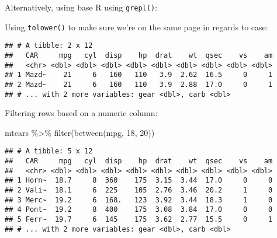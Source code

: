 \documentclass[
]{book}
\newenvironment{Shaded}{\begin{snugshade}}{\end{snugshade}}
\newcommand{\CommentTok}[1]{\textcolor[rgb]{0.56,0.35,0.01}{\textit{#1}}}
\newcommand{\DecValTok}[1]{\textcolor[rgb]{0.00,0.00,0.81}{#1}}
\newcommand{\FunctionTok}[1]{\textcolor[rgb]{0.00,0.00,0.00}{#1}}
\newcommand{\NormalTok}[1]{#1}
\newcommand{\SpecialCharTok}[1]{\textcolor[rgb]{0.00,0.00,0.00}{#1}}
\newcommand{\StringTok}[1]{\textcolor[rgb]{0.31,0.60,0.02}{#1}}
\begin{document}
Alternatively, using base R using \texttt{grepl()}:

\begin{Shaded}
\end{Shaded}

Using \texttt{tolower()} to make sure we're on the same page in regards to case:

\begin{Shaded}
\end{Shaded}

\begin{verbatim}
## # A tibble: 2 x 12
##   CAR     mpg   cyl  disp    hp  drat    wt  qsec    vs    am
##   <chr> <dbl> <dbl> <dbl> <dbl> <dbl> <dbl> <dbl> <dbl> <dbl>
## 1 Mazd~    21     6   160   110   3.9  2.62  16.5     0     1
## 2 Mazd~    21     6   160   110   3.9  2.88  17.0     0     1
## # ... with 2 more variables: gear <dbl>, carb <dbl>
\end{verbatim}

Filtering rows based on a numeric column:

\begin{Shaded}
\begin{Highlighting}[]
\NormalTok{mtcars }\SpecialCharTok{\%\textgreater{}\%} \FunctionTok{filter}\NormalTok{(}\FunctionTok{between}\NormalTok{(mpg, }\DecValTok{18}\NormalTok{, }\DecValTok{20}\NormalTok{))}
\end{Highlighting}
\end{Shaded}

\begin{verbatim}
## # A tibble: 5 x 12
##   CAR     mpg   cyl  disp    hp  drat    wt  qsec    vs    am
##   <chr> <dbl> <dbl> <dbl> <dbl> <dbl> <dbl> <dbl> <dbl> <dbl>
## 1 Horn~  18.7     8  360    175  3.15  3.44  17.0     0     0
## 2 Vali~  18.1     6  225    105  2.76  3.46  20.2     1     0
## 3 Merc~  19.2     6  168.   123  3.92  3.44  18.3     1     0
## 4 Pont~  19.2     8  400    175  3.08  3.84  17.0     0     0
## 5 Ferr~  19.7     6  145    175  3.62  2.77  15.5     0     1
## # ... with 2 more variables: gear <dbl>, carb <dbl>
\end{verbatim}
\end{document}
